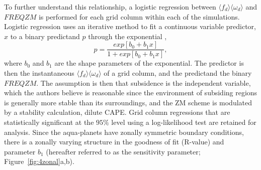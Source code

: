 \documentclass[times]{qjrms4}
\begin{document}
To further understand this relationship, a logistic regression between $\langle f_{d} \rangle \langle \omega_{d} \rangle$ and $FREQZM$ is performed for each grid column within each of the simulations. Logistic regression uses an iterative method to fit a continuous variable predictor, $x$ to a binary predictand $p$ through the exponential \citep{WILKSBOOK},
\begin{equation}
p = \frac{exp{[b_0 + b_1 x]}}{1 + exp{[b_0 + b_1 x]}}, \label{eq:eq6-3}
\end{equation}
where $b_0$ and $b_1$ are the shape parameters of the exponential. The predictor is then the instantaneous $\langle f_{d} \rangle \langle \omega_{d} \rangle$ of a grid column, and the predictand the binary $FREQZM$. The assumption is then that subsidence is the independent variable, which the authors believe is reasonable since the environment of subsiding regions is generally more stable than its surroundings, and the ZM scheme is modulated by a stability calculation, dilute CAPE. Grid column regressions that are statistically significant at the $95\%$ level using a log-likelihood test \citep{WILKSBOOK} are retained for analysis. Since the aqua-planets have zonally symmetric boundary conditions, there is a zonally varying structure in the goodness of fit (R-value) and parameter $b_1$ (hereafter referred to as the sensitivity parameter; Figure~\ref{fig:4zonal}a,b).
\end{document}
